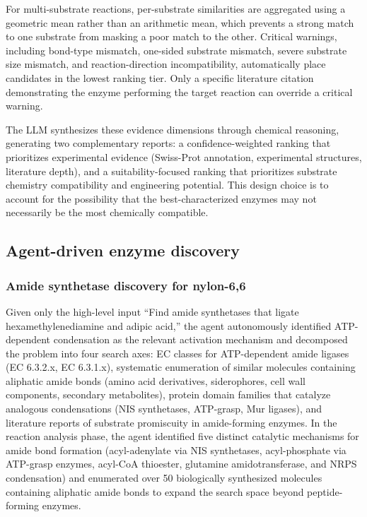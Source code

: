 \documentclass[12pt]{article}
\begin{document}
For multi-substrate reactions, per-substrate similarities are aggregated using a geometric mean rather than an arithmetic mean, which prevents a strong match to one substrate from masking a poor match to the other. Critical warnings, including bond-type mismatch, one-sided substrate mismatch, severe substrate size mismatch, and reaction-direction incompatibility, automatically place candidates in the lowest ranking tier. Only a specific literature citation demonstrating the enzyme performing the target reaction can override a critical warning.

The LLM synthesizes these evidence dimensions through chemical reasoning, generating two complementary reports: a confidence-weighted ranking that prioritizes experimental evidence (Swiss-Prot annotation, experimental structures, literature depth), and a suitability-focused ranking that prioritizes substrate chemistry compatibility and engineering potential. This design choice is to account for the possibility that the best-characterized enzymes may not necessarily be the most chemically compatible.

\subsection{Agent-driven enzyme discovery}
\label{sec:nylon_discovery}

\subsubsection{Amide synthetase discovery for nylon-6,6}
Given only the high-level input ``Find amide synthetases that ligate hexamethylenediamine and adipic acid,'' the agent autonomously identified ATP-dependent condensation as the relevant activation mechanism and decomposed the problem into four search axes: EC classes for ATP-dependent amide ligases (EC 6.3.2.x, EC 6.3.1.x), systematic enumeration of similar molecules containing aliphatic amide bonds (amino acid derivatives, siderophores, cell wall components, secondary metabolites), protein domain families that catalyze analogous condensations (NIS synthetases, ATP-grasp, Mur ligases), and literature reports of substrate promiscuity in amide-forming enzymes. In the reaction analysis phase, the agent identified five distinct catalytic mechanisms for amide bond formation (acyl-adenylate via NIS synthetases, acyl-phosphate via ATP-grasp enzymes, acyl-CoA thioester, glutamine amidotransferase, and NRPS condensation) and enumerated over 50 biologically synthesized molecules containing aliphatic amide bonds to expand the search space beyond peptide-forming enzymes.
\end{document}
